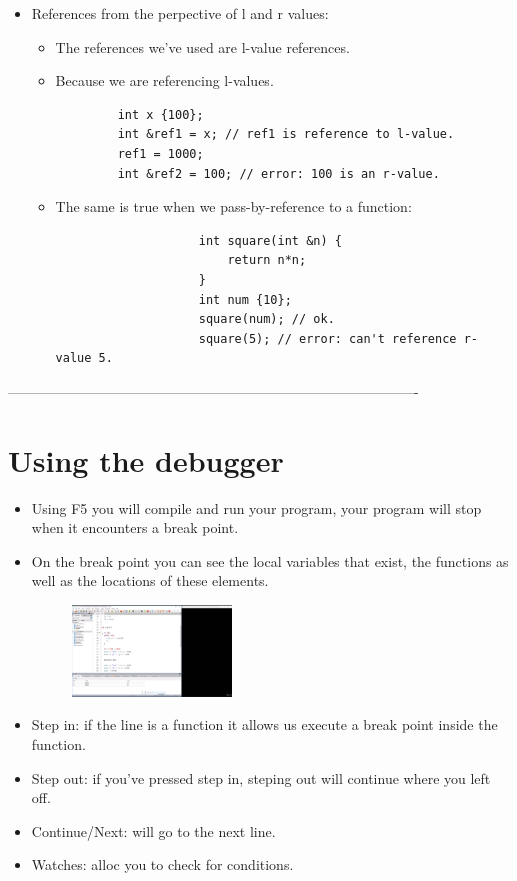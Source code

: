 \begin{itemize}
    \item References from the perpective of l and r values:
        \begin{itemize}
            \item The references we've used are l-value references.
            \item Because we are referencing l-values.
        \end{itemize}
        \begin{verbatim}
            int x {100};
            int &ref1 = x; // ref1 is reference to l-value.
            ref1 = 1000;
            int &ref2 = 100; // error: 100 is an r-value.
        \end{verbatim}
        \begin{itemize}
            \item The same is true when we pass-by-reference to a function:
                \begin{verbatim}
                    int square(int &n) {
                        return n*n;
                    }
                    int num {10};
                    square(num); // ok.
                    square(5); // error: can't reference r-value 5.
                \end{verbatim}
        \end{itemize}
\end{itemize}


----------------------------------------------------------------------------------------
\section{Using the debugger}
\begin{itemize}
    \item Using F5 you will compile and run your program, your program will stop when it encounters a break point.
    \item On the break point you can see the local variables that exist, the functions as well as the locations of these elements.
        \begin{figure}[H]
            \centering
            \includegraphics[width=0.4\textwidth]{./Figs/2021-01-15-09-19-44.png}
        \end{figure}
    
    \item Step in: if the line is a function it allows us execute a break point inside the function.
    \item Step out: if you've pressed step in, steping out will continue where you left off.
    \item Continue/Next: will go to the next line.
    \item Watches: alloc you to check for conditions.
\end{itemize}


